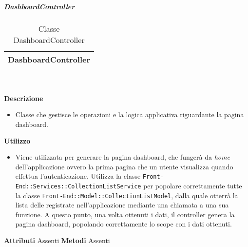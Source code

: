 			\subparagraph{DashboardController} 
\begin{table}[ht]
\begin{center}
\bgroup
	\setlength{\arrayrulewidth}{0.6mm}
	\def\arraystretch{1}
		\begin{tabular}{ | p{12cm} | }
				\hline  
					\centerline{\textbf{DashboardController}}
		\\ \hline 
				\hline
				\hline
		
		\end{tabular}
\egroup
\caption{Classe DashboardController}
\end{center}
\end{table} \textbf{\\ \\ Descrizione}
\begin{itemize}
\item[] Classe che gestisce le operazioni e la logica applicativa riguardante la pagina dashboard.
\end{itemize} 
\textbf{Utilizzo}
\begin{itemize}
\item[] Viene utilizzata per generare la pagina dashboard, che fungerà da \textit{home} dell'applicazione ovvero la prima pagina che un utente visualizza quando effettua l'autenticazione. Utilizza la classe \texttt{Front-End::Services::CollectionListService} per popolare correttamente tutte la classe \texttt{Front-End::Model::CollectionListModel}, dalla quale otterrà la lista delle  registrate nell'applicazione mediante una chiamata a una sua funzione. A questo punto, una volta ottenuti i dati, il controller genera la pagina dashboard, popolando correttamente lo scope con i dati ottenuti.
\end{itemize}
\textbf{Attributi}
Assenti
\textbf{Metodi}
Assenti

